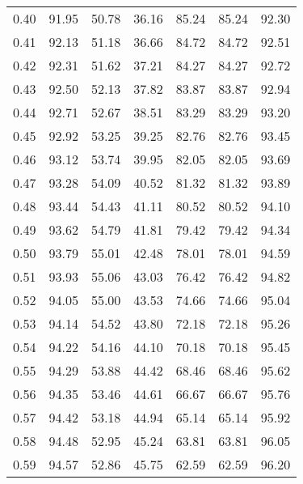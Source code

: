 \begin{tabular}{|c|c|c|c|c|c|c|}
      0.40 &     91.95 &     50.78 &      36.16 &   85.24 &      85.24 &         92.30 \\
      0.41 &     92.13 &     51.18 &      36.66 &   84.72 &      84.72 &         92.51 \\
      0.42 &     92.31 &     51.62 &      37.21 &   84.27 &      84.27 &         92.72 \\
      0.43 &     92.50 &     52.13 &      37.82 &   83.87 &      83.87 &         92.94 \\
      0.44 &     92.71 &     52.67 &      38.51 &   83.29 &      83.29 &         93.20 \\
      0.45 &     92.92 &     53.25 &      39.25 &   82.76 &      82.76 &         93.45 \\
      0.46 &     93.12 &     53.74 &      39.95 &   82.05 &      82.05 &         93.69 \\
      0.47 &     93.28 &     54.09 &      40.52 &   81.32 &      81.32 &         93.89 \\
      0.48 &     93.44 &     54.43 &      41.11 &   80.52 &      80.52 &         94.10 \\
      0.49 &     93.62 &     54.79 &      41.81 &   79.42 &      79.42 &         94.34 \\
      0.50 &     93.79 &     55.01 &      42.48 &   78.01 &      78.01 &         94.59 \\
      0.51 &     93.93 &     55.06 &      43.03 &   76.42 &      76.42 &         94.82 \\
      0.52 &     94.05 &     55.00 &      43.53 &   74.66 &      74.66 &         95.04 \\
      0.53 &     94.14 &     54.52 &      43.80 &   72.18 &      72.18 &         95.26 \\
      0.54 &     94.22 &     54.16 &      44.10 &   70.18 &      70.18 &         95.45 \\
      0.55 &     94.29 &     53.88 &      44.42 &   68.46 &      68.46 &         95.62 \\
      0.56 &     94.35 &     53.46 &      44.61 &   66.67 &      66.67 &         95.76 \\
      0.57 &     94.42 &     53.18 &      44.94 &   65.14 &      65.14 &         95.92 \\
      0.58 &     94.48 &     52.95 &      45.24 &   63.81 &      63.81 &         96.05 \\
      0.59 &     94.57 &     52.86 &      45.75 &   62.59 &      62.59 &         96.20 \\

\end{tabular}

